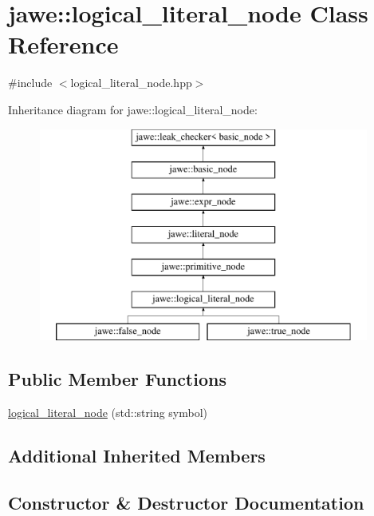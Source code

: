 \hypertarget{classjawe_1_1logical__literal__node}{}\section{jawe\+:\+:logical\+\_\+literal\+\_\+node Class Reference}
\label{classjawe_1_1logical__literal__node}


{\ttfamily \#include $<$logical\+\_\+literal\+\_\+node.\+hpp$>$}

Inheritance diagram for jawe\+:\+:logical\+\_\+literal\+\_\+node\+:\begin{figure}[H]
\begin{center}
\leavevmode
\includegraphics[height=7.000000cm]{classjawe_1_1logical__literal__node}
\end{center}
\end{figure}
\subsection*{Public Member Functions}
\begin{DoxyCompactItemize}
\item 
\hyperlink{classjawe_1_1logical__literal__node_a1f89f3f8d9b366ffde08cd4682f8ce9f}{logical\+\_\+literal\+\_\+node} (std\+::string symbol)
\end{DoxyCompactItemize}
\subsection*{Additional Inherited Members}


\subsection{Constructor \& Destructor Documentation}
\mbox{\label{classjawe_1_1logical__literal__node_a1f89f3f8d9b366ffde08cd4682f8ce9f}} 
